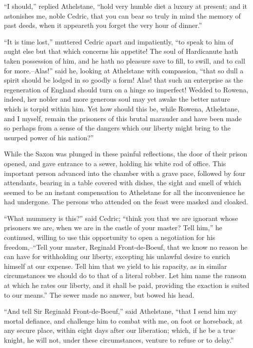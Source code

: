 ``I should,'' replied Athelstane, ``hold very humble diet a luxury at
present; and it astonishes me, noble Cedric, that you can bear so truly
in mind the memory of past deeds, when it appeareth you forget the very
hour of dinner.''

``It is time lost,'' muttered Cedric apart and impatiently, ``to speak
to him of aught else but that which concerns his appetite! The soul of
Hardicanute hath taken possession of him, and he hath no pleasure save
to fill, to swill, and to call for more.--Alas!'' said he, looking at
Athelstane with compassion, ``that so dull a spirit should be lodged in
so goodly a form! Alas! that such an enterprise as the regeneration of
England should turn on a hinge so imperfect! Wedded to Rowena, indeed,
her nobler and more generous soul may yet awake the better nature which
is torpid within him. Yet how should this be, while Rowena, Athelstane,
and I myself, remain the prisoners of this brutal marauder and have been
made so perhaps from a sense of the dangers which our liberty might
bring to the usurped power of his nation?''

While the Saxon was plunged in these painful reflections, the door of
their prison opened, and gave entrance to a sewer, holding his white rod
of office. This important person advanced into the chamber with a grave
pace, followed by four attendants, bearing in a table covered with
dishes, the sight and smell of which seemed to be an instant
compensation to Athelstane for all the inconvenience he had undergone.
The persons who attended on the feast were masked and cloaked.

``What mummery is this?'' said Cedric; ``think you that we are ignorant
whose prisoners we are, when we are in the castle of your master? Tell
him,'' he continued, willing to use this opportunity to open a
negotiation for his freedom,--``Tell your master, Reginald
Front-de-Boeuf, that we know no reason he can have for withholding our
liberty, excepting his unlawful desire to enrich himself at our expense.
Tell him that we yield to his rapacity, as in similar circumstances we
should do to that of a literal robber. Let him name the ransom at which
he rates our liberty, and it shall be paid, providing the exaction is
suited to our means.'' The sewer made no answer, but bowed his head.

``And tell Sir Reginald Front-de-Boeuf,'' said Athelstane, ``that I send
him my mortal defiance, and challenge him to combat with me, on foot or
horseback, at any secure place, within eight days after our liberation;
which, if he be a true knight, he will not, under these circumstances,
venture to refuse or to delay.''


